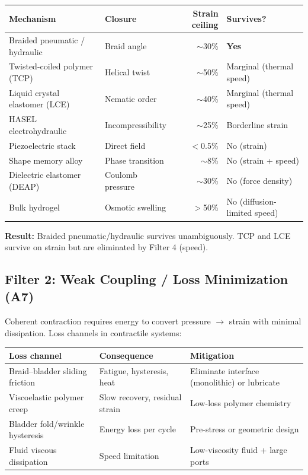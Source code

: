 \documentclass[11pt, a4paper]{article}
\begin{document}
\begin{center}
\begin{tabular}{@{}llrl@{}}
\toprule
\textbf{Mechanism} & \textbf{Closure} & \textbf{Strain ceiling} &
  \textbf{Survives?} \\
\midrule
Braided pneumatic / hydraulic & Braid angle & $\sim$30\% &
  \textcolor{nm-green}{\textbf{Yes}} \\
Twisted-coiled polymer (TCP) & Helical twist & $\sim$50\% &
  \textcolor{nm-orange}{Marginal (thermal speed)} \\
Liquid crystal elastomer (LCE) & Nematic order & $\sim$40\% &
  \textcolor{nm-orange}{Marginal (thermal speed)} \\
HASEL electrohydraulic & Incompressibility & $\sim$25\% &
  \textcolor{nm-orange}{Borderline strain} \\
Piezoelectric stack & Direct field & $<$0.5\% &
  \textcolor{nm-red}{No (strain)} \\
Shape memory alloy & Phase transition & $\sim$8\% &
  \textcolor{nm-red}{No (strain + speed)} \\
Dielectric elastomer (DEAP) & Coulomb pressure & $\sim$30\% &
  \textcolor{nm-red}{No (force density)} \\
Bulk hydrogel & Osmotic swelling & $>$50\% &
  \textcolor{nm-red}{No (diffusion-limited speed)} \\
\bottomrule
\end{tabular}
\end{center}

\textbf{Result:} \textcolor{nm-green}{Braided pneumatic/hydraulic
survives unambiguously.} TCP and LCE survive on strain but are
eliminated by Filter 4 (speed).

\subsection{Filter 2: Weak Coupling / Loss Minimization (A7)}

Coherent contraction requires energy to convert pressure
$\to$ strain with minimal dissipation. Loss channels in
contractile systems:

\begin{center}
\begin{tabular}{@{}lll@{}}
\toprule
\textbf{Loss channel} & \textbf{Consequence} & \textbf{Mitigation} \\
\midrule
Braid--bladder sliding friction & Fatigue, hysteresis, heat &
  Eliminate interface (monolithic) or lubricate \\
Viscoelastic polymer creep & Slow recovery, residual strain &
  Low-loss polymer chemistry \\
Bladder fold/wrinkle hysteresis & Energy loss per cycle &
  Pre-stress or geometric design \\
Fluid viscous dissipation & Speed limitation &
  Low-viscosity fluid + large ports \\
\bottomrule
\end{tabular}
\end{center}
\end{document}
